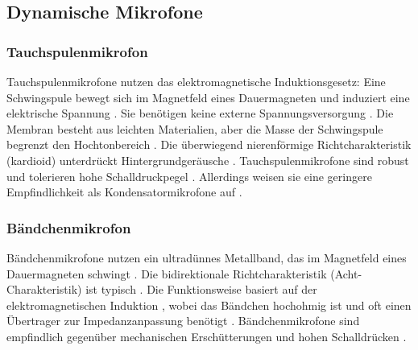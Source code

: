 \bigskip

\subsection{Dynamische Mikrofone}

\subsubsection{Tauchspulenmikrofon}
Tauchspulenmikrofone nutzen das elektromagnetische Induktionsgesetz: Eine Schwingspule bewegt sich im Magnetfeld eines Dauermagneten und induziert eine elektrische Spannung \cite{Weinzierl:2008}\cite{Bernstein:2019a}\cite{Görne:2014c}. Sie benötigen keine externe Spannungsversorgung \cite{Weinzierl:2008}.
Die Membran besteht aus leichten Materialien, aber die Masse der Schwingspule begrenzt den Hochtonbereich \cite{Weinzierl:2008}. Die überwiegend nierenförmige Richtcharakteristik (kardioid) unterdrückt Hintergrundgeräusche \cite{Weinzierl:2008}.
Tauchspulenmikrofone sind robust und tolerieren hohe Schalldruckpegel \cite{Weinzierl:2008}. Allerdings weisen sie eine geringere Empfindlichkeit als Kondensatormikrofone auf \cite{Weinzierl:2008}.

\bigskip

\subsubsection{Bändchenmikrofon}
Bändchenmikrofone nutzen ein ultradünnes Metallband, das im Magnetfeld eines Dauermagneten schwingt \cite{Weinzierl:2008}\cite{Bernstein:2019a}. Die bidirektionale Richtcharakteristik (Acht-Charakteristik) ist typisch \cite{Weinzierl:2008}.
Die Funktionsweise basiert auf der elektromagnetischen Induktion \cite{Görne:2014c}, wobei das Bändchen hochohmig ist und oft einen Übertrager zur Impedanzanpassung benötigt \cite{Weinzierl:2008}\cite{Bernstein:2019a}.
Bändchenmikrofone sind empfindlich gegenüber mechanischen Erschütterungen \cite{Bernstein:2019b} und hohen Schalldrücken \cite{Weinzierl:2008}.

\bigskip

